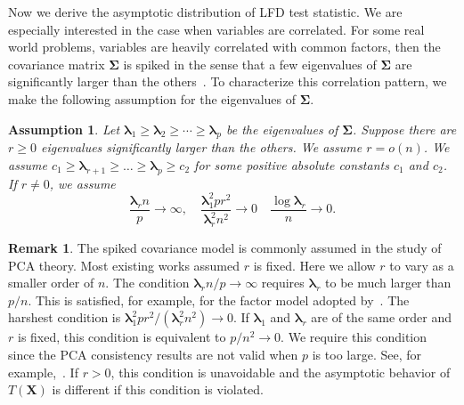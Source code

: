 \documentclass[12pt]{article} %
\newcommand{\bX}{\mathbf{X}}
\newcommand{\bfsym}[1]{\ensuremath{\boldsymbol{#1}}}
\def\blambda {\bfsym {\lambda}}
\def\bSigma {\bfsym {\Sigma}}
\newtheorem{assumption}{Assumption}
\theoremstyle{definition}
\newtheorem{remark}{Remark}
\begin{document}
Now we derive the asymptotic distribution of LFD test statistic.
We are especially interested in the case when variables are correlated.
For some real world problems, variables are heavily correlated with common factors, then the covariance matrix $\bSigma$ is spiked in the sense that a few eigenvalues of $\bSigma$ are significantly larger than the others~\citep{Fan2008High,Cai2012Sparse,Shen2013Consistency,Ma2015A}.
To characterize this correlation pattern, we make the following assumption for the eigenvalues of $\bSigma$.




\begin{assumption}\label{assumpEigen}
    Let $\blambda_1\geq \blambda_2\geq \cdots \geq \blambda_p$ be the eigenvalues of $\bSigma$.
    Suppose there are $r\geq 0$ eigenvalues significantly larger than the others.
    We assume $r=o(n)$.
    We assume
 $c_1 \geq \blambda_{r+1} \geq \ldots \geq \blambda_{p} \geq c_2$ for some positive absolute constants $c_1$ and $c_2$.
    If $r\neq 0$, we assume 
    $$\frac{\blambda_r n}{p}\to \infty,\quad
    \frac{\blambda_1^2 pr^2}{\blambda_r^2 n^2}\to 0\quad
        \frac{\log \blambda_r}{n}\to 0.$$
\end{assumption}

\begin{remark}
The spiked covariance model is commonly assumed in the study of PCA theory.
Most existing works assumed $r$ is fixed.
    Here we allow $r$ to vary as a smaller order of $n$.
    The condition $\blambda_r n/p\to \infty$ requires $\blambda_r$ to be much larger than $p/n$. This is satisfied, for example, for the factor model adopted by~\citet{Ma2015A}.
    The harshest condition is $\blambda_1^2 p r^2 /(\blambda_r^2 n^2)\to 0$.
    If $\blambda_1$ and $\blambda_r$ are of the same order and $r$ is fixed, this condition is equivalent to $p/n^2\to 0$.
    We require this condition since the PCA consistency results are not valid when $p$ is too large. See, for example,~\citep{Cai2012Sparse}.
    If $r>0$, this condition is unavoidable and the asymptotic behavior of $T(\bX)$ is different if this condition is violated.
\end{remark}
\end{document}
